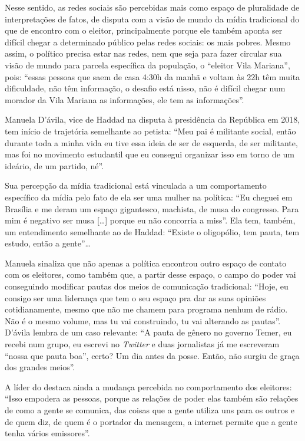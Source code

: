 Nesse sentido, as redes sociais são percebidas mais como espaço de
pluralidade de interpretações de fatos, de disputa com a visão de mundo
da mídia tradicional do que de encontro com o eleitor, principalmente
porque ele também aponta ser difícil chegar a determinado público pelas
redes sociais: os mais pobres. Mesmo assim, o político precisa estar nas
redes, nem que seja para fazer circular sua visão de mundo para parcela
específica da população, o ``eleitor Vila Mariana'', pois: ``essas
pessoas que saem de casa 4:30h da manhã e voltam às 22h têm muita
dificuldade, não têm informação, o desafio está nisso, não é difícil
chegar num morador da Vila Mariana as informações, ele tem as
informações''.

Manuela D'ávila, vice de Haddad na disputa à presidência da República em
2018, tem início de trajetória semelhante ao petista: ``Meu pai é
militante social, então durante toda a minha vida eu tive essa ideia de
ser de esquerda, de ser militante, mas foi no movimento estudantil que
eu consegui organizar isso em torno de um ideário, de um partido, né''.

Sua percepção da mídia tradicional está vinculada a um comportamento
específico da mídia pelo fato de ela ser uma mulher na política: ``Eu
cheguei em Brasília e me deram um espaço gigantesco, machista, de musa
do congresso. Para mim é negativo ser musa {[}\ldots{}{]} porque eu não
concorria a miss''. Ela tem, também, um entendimento semelhante ao de
Haddad: ``Existe o oligopólio, tem pauta, tem estudo, então a gente''\ldots{}

Manuela sinaliza que não apenas a política encontrou outro espaço de
contato com os eleitores, como também que, a partir desse espaço, o
campo do poder vai conseguindo modificar pautas dos meios de comunicação
tradicional: ``Hoje, eu consigo ser uma liderança que tem o seu espaço
pra dar as suas opiniões cotidianamente, mesmo que não me chamem para
programa nenhum de rádio. Não é o mesmo volume, mas tu vai construindo,
tu vai alterando as pautas''. D'ávila lembra de um caso relevante: ``A
pauta de gênero no governo Temer, eu recebi num grupo, eu escrevi no
\emph{Twitter} e duas jornalistas já me escreveram ``nossa que pauta
boa'', certo? Um dia antes da posse. Então, não surgiu de graça dos
grandes meios''.

A líder do  destaca ainda a mudança percebida no comportamento
dos eleitores: ``Isso empodera as pessoas, porque as relações de poder
elas também são relações de como a gente se comunica, das coisas que a
gente utiliza uns para os outros e de quem diz, de quem é o portador da
mensagem, a internet permite que a gente tenha vários emissores''.

